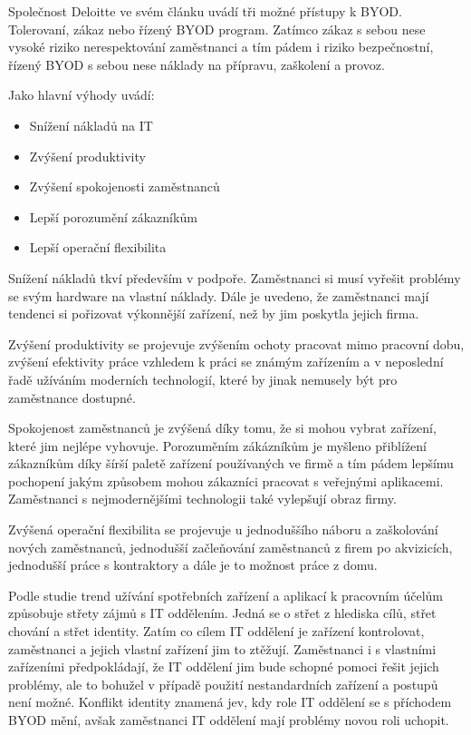 Společnost Deloitte ve svém článku uvádí tři možné přístupy k BYOD. Tolerovaní, zákaz nebo řízený BYOD program. Zatímco zákaz s sebou nese vysoké riziko nerespektování zaměstnanci a tím pádem i riziko bezpečnostní, řízený BYOD s sebou nese náklady na přípravu, zaškolení a provoz.

Jako hlavní výhody uvádí:
\begin{itemize}
\item Snížení nákladů na IT
\item Zvýšení produktivity
\item Zvýšení spokojenosti zaměstnanců
\item Lepší porozumění zákazníkům
\item Lepší operační flexibilita
\end{itemize}

Snížení nákladů tkví především v podpoře. Zaměstnanci si musí vyřešit problémy se svým hardware na vlastní náklady. Dále je uvedeno, že zaměstnanci mají tendenci si pořizovat výkonnější zařízení, než by jim poskytla jejich firma. 

Zvýšení produktivity se projevuje zvýšením ochoty pracovat mimo pracovní dobu, zvýšení efektivity práce vzhledem k práci se známým zařízením a v neposlední řadě užíváním moderních technologií, které by jinak nemusely být pro zaměstnance dostupné. 

Spokojenost zaměstnanců je zvýšená díky tomu, že si mohou vybrat zařízení, které jim nejlépe vyhovuje. Porozuměním zákázníkům je myšleno přiblížení zákazníkům díky šírší paletě zařízení používaných ve firmě a tím pádem lepšímu pochopení jakým způsobem mohou zákazníci pracovat s veřejnými aplikacemi. Zaměstnanci s nejmodernějšími technologii také vylepšují obraz firmy.

Zvýšená operační flexibilita se projevuje u jednoduššího náboru a zaškolování nových zaměstnanců, jednodušší začleňování zaměstnanců z firem po akvizicích, jednodušší práce s kontraktory a dále je to možnost práce z domu.


Podle studie  trend užívání spotřebních zařízení a aplikací k pracovním účelům způsobuje střety zájmů s IT oddělením. Jedná se o střet z hlediska cílů, střet chování a střet identity. Zatím co cílem IT oddělení je zařízení kontrolovat, zaměstnanci a jejich vlastní zařízení jim to ztěžují. Zaměstnanci i s vlastními zařízeními předpokládají, že IT oddělení jim bude schopné pomoci řešit jejich problémy, ale to bohužel v případě použití nestandardních zařízení a postupů není možné. Konflikt identity znamená jev, kdy role IT oddělení se s příchodem BYOD mění, avšak zaměstnanci IT oddělení mají problémy novou roli uchopit.

